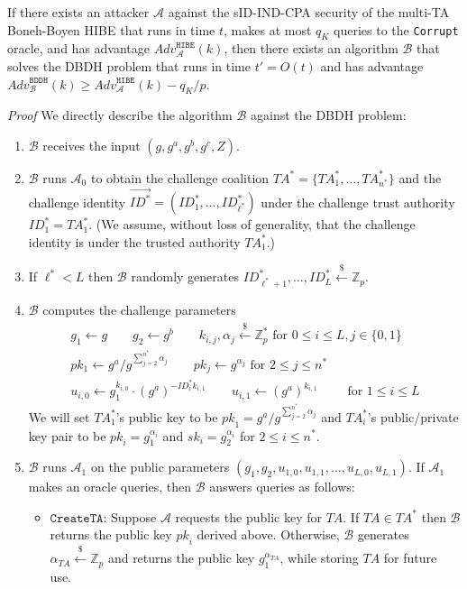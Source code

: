 \documentclass[10pt]{llncs}
\newcommand{\A}{\mathcal{A}}
\newcommand{\B}{\mathcal{B}}
\newcommand{\Zbb}{\mathbb{Z}}
\newcommand{\ID}{\mathit{ID}}
\newcommand{\TA}{\mathit{TA}}
\newcommand{\pk}{\mathit{pk}}
\newcommand{\sk}{\mathit{sk}}
\newcommand{\getsr}{\stackrel{{\scriptscriptstyle\$}}{\gets}}
\newcommand{\adv}[2]{\mathit{Adv}_{#1}^{\texttt{#2}}}
\begin{document}
\begin{theorem}
If there exists an attacker $\A$ against the sID-IND-CPA security of
the multi-TA Boneh-Boyen HIBE that runs in time $t$, makes at most
$q_{K}$ queries to the \texttt{Corrupt} oracle, and has advantage
$\adv{\A}{HIBE}(k)$, then there exists an algorithm $\B$ that solves
the DBDH problem that runs in time $t'=O(t)$ and has advantage
$\adv{\B}{BDDH}(k) \geq \adv{\A}{HIBE}(k) -q_{K}/p$.
\end{theorem}
\emph{Proof} We directly describe the algorithm $\B$ against the DBDH problem:
\begin{enumerate}
\item $\B$ receives the input $(g,g^{a},g^{b},g^{c},Z)$.
\item $\B$ runs $\A_{0}$ to obtain the challenge coalition
$\TA^{*}=\{\TA^{*}_{1},\ldots,\TA^{*}_{n^{*}}\}$ and the
challenge identity
$\vec{\ID^{*}}=(\ID^{*}_{1},\ldots,\ID^{*}_{\ell^{*}})$ under
the challenge trust authority $\ID^{*}_{1} = \TA^{*}_{1}$. (We
assume, without loss of generality, that the challenge identity
is under the trusted authority $\TA^{*}_{1}$.)
\item If $\ell^{*} < L$ then $\B$ randomly generates $\ID^{*}_{\ell^{*}+1},\ldots,\ID^{*}_{L}\getsr \Zbb_{p}$.
\item $\B$ computes the challenge parameters
    \begin{displaymath}
    \begin{array}{c}
    g_{1} \gets g \qquad g_{2}\gets g^{b} \qquad k_{i,j}, \alpha_{j} \getsr \Zbb_{p}^{*} \mbox{ for } 0\leq i\leq L, j\in \{0,1\}\\
    pk_1 \gets g^{a}/g^{\sum_{j=2}^{n^{*}} \alpha_{j}} \qquad pk_j \gets g^{\alpha_{j}} \mbox{ for } 2\leq j\leq n^{*}\\
    u_{i,0} \gets g_{1}^{k_{i,0}}\cdot (g^{a})^{-\ID^{*}_{i}k_{i,1}} \qquad u_{i,1} \gets (g^{a})^{k_{i,1}} \qquad \mbox{ for } 1\leq i\leq L
    \end{array}
    \end{displaymath}
    We will set $\TA^{*}_{1}$'s public key to be $\pk_{1} =
    g^{a} / g^{\sum_{j=2}^{n^{*}} \alpha_{j}}$ and
    $\TA^{*}_{i}$'s public/private key pair to be $\pk_{i} =
    g_{1}^{\alpha_{i}}$ and $\sk_{i} = g_{2}^{\alpha_{i}}$ for
    $2\leq i\leq n^{*}$.
\item $\B$ runs $\A_{1}$ on the public parameters $(g_{1},g_{2},u_{1,0},u_{1,1},\ldots,u_{L,0},u_{L,1})$. If $\A_{1}$ makes an oracle queries, then $\B$ answers queries as follows:
    \begin{itemize}
    \item $\texttt{CreateTA}$: Suppose $\A$ requests the public key for $\TA$.
    If $\TA \in \TA^{*}$ then $\B$ returns the public key
    $\pk_{i}$ derived above. Otherwise, $\B$ generates
    $\alpha_{\TA} \getsr \Zbb_{p}$ and returns the public
    key $g_{1}^{\alpha_{\TA}}$, while storing $\TA$ for
    future use.


\end{itemize}
\end{enumerate}
\end{document}

